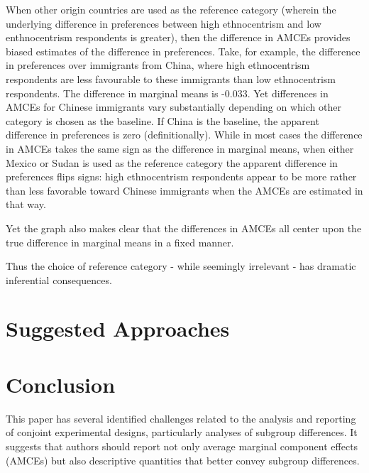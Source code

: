 \documentclass[a4paper,12pt]{article}\usepackage[]{graphicx}\usepackage[]{color}
\begin{document}
When other origin countries are used as the reference category (wherein the underlying difference in preferences between high ethnocentrism and low enthnocentrism respondents is greater), then the difference in AMCEs provides biased estimates of the difference in preferences. Take, for example, the difference in preferences over immigrants from China, where high ethnocentrism respondents are less favourable to these immigrants than low ethnocentrism respondents. The difference in marginal means is -0.033. Yet differences in AMCEs for Chinese immigrants vary substantially depending on which other category is chosen as the baseline. If China is the baseline, the apparent difference in preferences is zero (definitionally). While in most cases the difference in AMCEs takes the same sign as the difference in marginal means, when either Mexico or Sudan is used as the reference category the apparent difference in preferences flips signs: high ethnocentrism respondents appear to be more rather than less favorable toward Chinese immigrants when the AMCEs are estimated in that way.

Yet the graph also makes clear that the differences in AMCEs all center upon the true difference in marginal means in a fixed manner.

Thus the choice of reference category - while seemingly irrelevant - has dramatic inferential consequences.

\section{Suggested Approaches}



\section{Conclusion}

This paper has several identified challenges related to the analysis and reporting of conjoint experimental designs, particularly analyses of subgroup differences. It suggests that authors should report not only average marginal component effects (AMCEs) but also descriptive quantities that better convey subgroup differences.

\singlespacing


\clearpage
\end{document}
